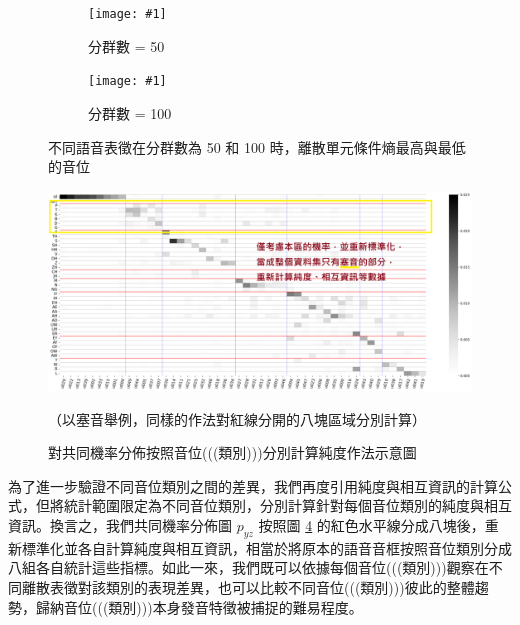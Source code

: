 {

\newcommand{\jeffheightt}[1]{\texttt{[image: \#1]}}

\begin{figure}
     \centering
     \begin{subfigure}{\textwidth}  %
         \centering
         \jeffheightt{figures/phnrank50.png}
         \caption{分群數 = 50}
         \label{fig:phn-specials-clu50}
     \end{subfigure}
     \vfill

     \begin{subfigure}{\textwidth}  %
         \centering
         \jeffheightt{figures/phnrank100.png}
         \caption{分群數 = 100}
         \label{fig:phn-specials-clu100}
     \end{subfigure}

     \caption{不同語音表徵在分群數為 50 和 100 時，離散單元條件熵最高與最低的音位}
     \label{fig:phn-specials}
\end{figure}

}



\begin{figure}
    \centering
    \includegraphics[width=1\linewidth]{figures/better-demo-splitter.png}
    \caption{對共同機率分佈按照音位(((類別)))分別計算純度作法示意圖}
    （以塞音舉例，同樣的作法對紅線分開的八塊區域分別計算）
    \label{fig:demo-splitter}
\end{figure}


        為了進一步驗證不同音位類別之間的差異，我們再度引用純度與相互資訊的計算公式，但將統計範圍限定為不同音位類別，分別計算針對每個音位類別的純度與相互資訊。換言之，我們共同機率分佈圖 $p_{yz}$ 按照圖 \ref{fig:demo-splitter} 的紅色水平線分成八塊後，重新標準化並各自計算純度與相互資訊，相當於將原本的語音音框按照音位類別分成八組各自統計這些指標。如此一來，我們既可以依據每個音位(((類別)))觀察在不同離散表徵對該類別的表現差異，也可以比較不同音位(((類別)))彼此的整體趨勢，歸納音位(((類別)))本身發音特徵被捕捉的難易程度。

